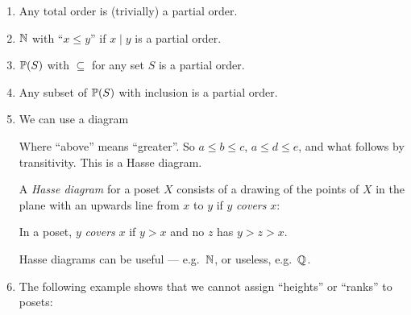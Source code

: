 \documentclass[a4paper]{article}
\begin{document}
\begin{eg}\leavevmode
  \begin{enumerate}
    \item Any total order is (trivially) a partial order.
    \item $\N$ with ``$x\leq y$'' if $x \mid y$ is a partial order.
    \item $\P(S)$ with $\subseteq$ for any set $S$ is a partial order.
    \item Any subset of $\P(S)$ with inclusion is a partial order.
    \item We can use a diagram
      \begin{center}
      \end{center}
      Where ``above'' means ``greater''. So $a \leq b\leq c$, $a \leq d\leq e$, and what follows by transitivity. This is a Hasse diagram.

      \begin{defi}
        A \emph{Hasse diagram} for a poset $X$ consists of a drawing of the points of $X$ in the plane with an upwards line from $x$ to $y$ if $y$ \emph{covers} $x$:
      \end{defi}
      \begin{defi}[Cover]
        In a poset, $y$ \emph{covers} $x$ if $y > x$ and no $z$ has $y > z > x$.
      \end{defi}
      Hasse diagrams can be useful --- e.g.\ $\N$, or useless, e.g.\ $\Q$.
    \item The following example shows that we cannot assign ``heights'' or ``ranks'' to posets:
      \begin{center}
\end{center}
\end{enumerate}
\end{eg}
\end{document}

